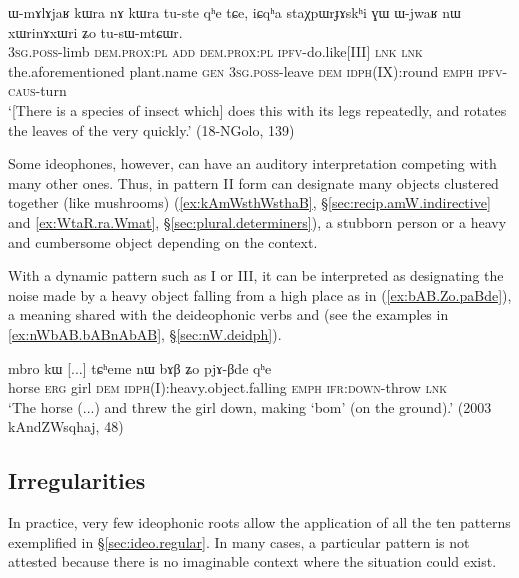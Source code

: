 \begin{exe} 
\ex  \label{ex:xWrinAxWri}
\gll ɯ-mɤlɤjaʁ kɯra nɤ kɯra tu-ste qʰe tɕe, iɕqʰa staχpɯrɟɤskʰi ɣɯ ɯ-jwaʁ nɯ xɯrinɤxɯri ʑo tu-sɯ-mtɕɯr. \\
\textsc{3sg}.\textsc{poss}-limb \textsc{dem}.\textsc{prox}:\textsc{pl} \textsc{add}  \textsc{dem}.\textsc{prox}:\textsc{pl} \textsc{ipfv}-do.like[III] \textsc{lnk} \textsc{lnk} the.aforementioned plant.name \textsc{gen} \textsc{3sg}.\textsc{poss}-leave \textsc{dem} \textsc{idph}(IX):round \textsc{emph} \textsc{ipfv}-\textsc{caus}-turn \\
\glt `[There is a species of insect which] does this with its legs repeatedly, and rotates the leaves of the  very quickly.' (18-NGolo, 139)
\end{exe} 

Some ideophones, however, can have an auditory interpretation competing with many other ones. Thus,  in pattern II form  can designate many objects clustered together (like mushrooms) (\ref{ex:kAmWsthWsthaB}, §\ref{sec:recip.amW.indirective} and \ref{ex:WtaR.ra.Wmat}, §\ref{sec:plural.determiners}), a stubborn person or a heavy and cumbersome object depending on the context. 

With a dynamic pattern such as I or III, it can be interpreted as designating the noise made by a heavy object falling from a high place as in (\ref{ex:bAB.Zo.paBde}), a meaning shared with the deideophonic verbs  and  (see the examples in  \ref{ex:nWbAB.bABnAbAB}, §\ref{sec:nW.deidph}).

\begin{exe}
\ex \label{ex:bAB.Zo.paBde}
\gll mbro kɯ [...] tɕʰeme nɯ bɤβ ʑo pjɤ-βde qʰe \\
horse \textsc{erg} { } girl \textsc{dem} \textsc{idph}(I):heavy.object.falling \textsc{emph} \textsc{ifr}:\textsc{down}-throw \textsc{lnk}  \\
\glt `The horse (...) and threw the girl down, making `bom' (on the ground).' (2003 kAndZWsqhaj, 48)
\end{exe}


\subsection{Irregularities} \label{sec:ideo.irregular}
In practice, very few ideophonic roots allow the application of all the ten patterns exemplified in §\ref{sec:ideo.regular}.  In many cases, a particular pattern is not attested because there is no imaginable context where the situation could exist.

